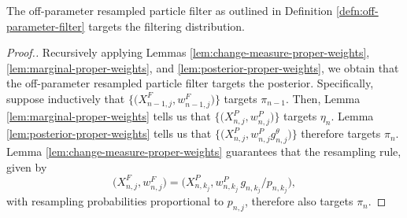     


\begin{thm}
    \label{thm:off-parameter-targeting}
    The off-parameter resampled particle filter as outlined in Definition \ref{defn:off-parameter-filter} targets the filtering distribution.
\end{thm}
\begin{proof}[Proof.]
    Recursively applying Lemmas \ref{lem:change-measure-proper-weights}, \ref{lem:marginal-proper-weights}, and \ref{lem:posterior-proper-weights}, we obtain that the off-parameter resampled particle filter targets the posterior.
    Specifically, suppose inductively that $\big\{\big(X^{F}_{n-1,j},w^{F}_{n-1,j}\big)\big\}$ targets $\pi_{n-1}$.
    Then, Lemma \ref{lem:marginal-proper-weights} tells us that $\big\{\big(X^{P}_{n,j},w^{P}_{n,j}\big)\big\}$ targets $\eta_n$.
    Lemma \ref{lem:posterior-proper-weights} tells us that $\big\{\big(X^{P}_{n,j},w^{P}_{n,j} g^\theta_{n,j} \big)\big\}$ therefore targets  $\pi_n$.
    Lemma \ref{lem:change-measure-proper-weights} guarantees that the resampling rule, given by 
    \begin{equation}
    \big(X^{F}_{n,j},w^{F}_{n,j}\big) = \big(X^{P}_{n,k_j}, w^{P}_{n,k_j} \, g_{n,k_j}\big/ p_{n,k_j}\big),
    \end{equation}
    with resampling probabilities proportional to $p_{n,j}$, therefore also targets $\pi_n$.
\end{proof}

